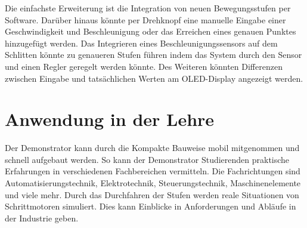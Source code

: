 Die einfachste Erweiterung ist die Integration von neuen Bewegungsstufen per Software. Darüber hinaus könnte per Drehknopf eine manuelle Eingabe einer Geschwindigkeit und Beschleunigung oder das Erreichen eines genauen Punktes hinzugefügt werden. Das Integrieren eines Beschleunigungssensors auf dem Schlitten könnte zu genaueren Stufen führen indem das System durch den Sensor und einen Regler geregelt werden könnte. Des Weiteren könnten Differenzen zwischen Eingabe und tatsächlichen Werten am OLED-Display angezeigt werden. 

\section{Anwendung in der Lehre}

Der Demonstrator kann durch die Kompakte Bauweise mobil mitgenommen und schnell aufgebaut werden. So kann der Demonstrator Studierenden praktische Erfahrungen in verschiedenen Fachbereichen vermitteln. Die Fachrichtungen sind Automatisierungstechnik, Elektrotechnik, Steuerungstechnik, Maschinenelemente und viele mehr. Durch das Durchfahren der Stufen werden reale Situationen von Schrittmotoren simuliert. Dies kann Einblicke in Anforderungen und Abläufe in der Industrie geben. 
